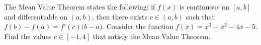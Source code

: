 \documentclass[11pt,letterpaper]{article}
\begin{document}
\newpage



 The Mean Value Theorem states the following: if $f(x)$ is continuous on $[a, b]$ and differentiable on $(a, b)$, then there exists $c \in (a, b)$ such that $f(b) - f(a)= f'(c) \big( b - a \big)$. Consider the function $f(x)= x^3 + x^2 - 4x - 5$. Find the values $c \in [-1, 4]$ that satisfy the Mean Value Theorem. 
\end{document}
